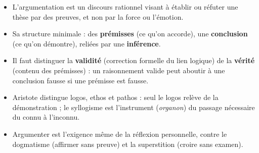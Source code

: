 \documentclass[11pt]{article}
\begin{document}
\begin{aretenir}
\begin{itemize}
\item L'argumentation est un discours rationnel visant à établir ou réfuter une thèse par des preuves, et non par la force ou l'émotion.
\item Sa structure minimale : des \textbf{prémisses} (ce qu'on accorde), une \textbf{conclusion} (ce qu'on démontre), reliées par une \textbf{inférence}.
\item Il faut distinguer la \textbf{validité} (correction formelle du lien logique) de la \textbf{vérité} (contenu des prémisses) : un raisonnement valide peut aboutir à une conclusion fausse si une prémisse est fausse.
\item Aristote distingue logos, ethos et pathos : seul le logos relève de la démonstration ; le syllogisme est l'instrument (\emph{organon}) du passage nécessaire du connu à l'inconnu.
\item Argumenter est l'exigence même de la réflexion personnelle, contre le dogmatisme (affirmer sans preuve) et la superstition (croire sans examen).
\end{itemize}
\end{aretenir}
\end{document}
